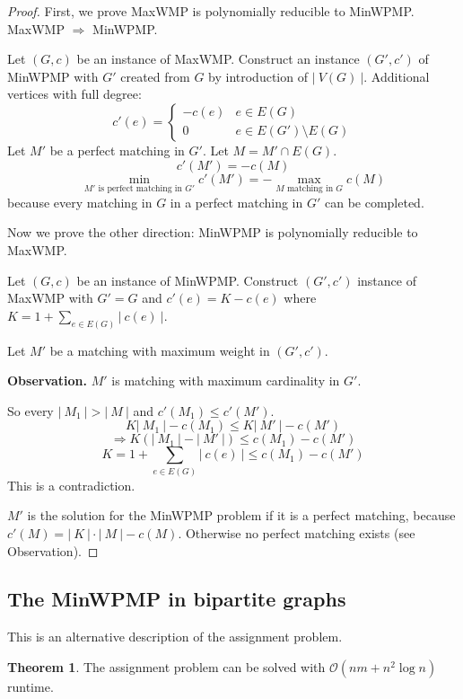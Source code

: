\documentclass[a4paper]{article}
\theoremstyle{definition}
\newtheorem{theorem}{Theorem}
\newcommand{\card}[1]{\left|\:\!#1\:\!\right|}
\begin{document}
\begin{proof}
  First, we prove MaxWMP is polynomially reducible to MinWPMP. MaxWMP $\Rightarrow$ MinWPMP.

  Let $(G, c)$ be an instance of MaxWMP.
  Construct an instance $(G', c')$ of MinWPMP with $G'$ created from $G$ by introduction of $\card{V(G)}$.
  Additional vertices with full degree:
  \[
    c'(e) = \begin{cases}
      -c(e)  & e \in E(G) \\
      0      & e \in E(G') \setminus E(G)
    \end{cases}
  \]
  Let $M'$ be a perfect matching in $G'$. Let $M = M' \cap E(G)$.
  \[ c'(M') = -c(M) \]
  \[ \min_{M' \text{ is perfect matching in } G'} c'(M') = -\max_{M \text{ matching in } G} c(M) \]
  because every matching in $G$ in a perfect matching in $G'$ can be completed.

  Now we prove the other direction: MinWPMP is polynomially reducible to MaxWMP.

  Let $(G, c)$ be an instance of MinWPMP. Construct $(G', c')$ instance of MaxWMP with $G' = G$ and $c'(e) = K - c(e)$ where $K = 1 + \sum_{e \in E(G)} \card{c(e)}$.

  Let $M'$ be a matching with maximum weight in $(G', c')$.

  \textbf{Observation.} $M'$ is matching with maximum cardinality in $G'$.

  So every $\card{M_1} > \card{M}$ and $c'(M_1) \leq c'(M')$.
  \[
    K \card{M_1} - c(M_1) \leq K \card{M'} - c(M')
  \] \[
    \Rightarrow K\left( \card{M_1} - \card{M'} \right) \leq c(M_1) - c(M')
  \] \[
    K = 1 + \sum_{e \in E(G)} \card{c(e)} \leq c(M_1) - c(M')
  \]
  This is a contradiction.

  $M'$ is the solution for the MinWPMP problem if it is a perfect matching, because $c'(M) = \card{K} \cdot \card{M} - c(M)$.
  Otherwise no perfect matching exists (see Observation).
\end{proof}

\subsection{The MinWPMP in bipartite graphs}

This is an alternative description of the assignment problem.

\begin{theorem}\label{satz-7.2_}
  The assignment problem can be solved with $\mathcal{O}(nm + n^2\log{n})$ runtime.
\end{theorem}
\end{document}
